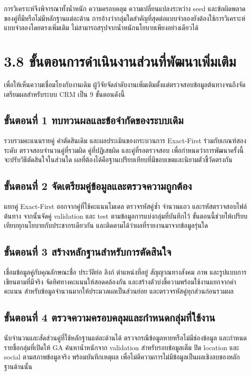 \documentclass[12pt,a4paper]{report}
\begin{document}
การวิเคราะห์จึงพิจารณาทั้งน้ำหนัก ความครอบคลุม ความเปลี่ยนแปลงระหว่าง seed และข้อผิดพลาดของคู่ที่มีหรือไม่มีหลักฐานแต่ละด้าน การอ้างว่ากลุ่มใดสำคัญที่สุดต่อแบบจำลองยังต้องใช้การวิเคราะห์แบบจำลองโดยตรงเพิ่มเติม ไม่สามารถสรุปจากน้ำหนักนโยบายเพียงอย่างเดียวได้

\section*{3.8 ขั้นตอนการดำเนินงานส่วนที่พัฒนาเพิ่มเติม}
เพื่อให้เห็นความเชื่อมโยงกับงานเดิม ผู้วิจัยจัดลำดับงานเพิ่มเติมตั้งแต่ตรวจสอบข้อมูลต้นทางจนถึงจัดเตรียมผลสำหรับระบบ CRM เป็น 9 ขั้นตอนดังนี้

\subsection*{ขั้นตอนที่ 1 ทบทวนผลและข้อจำกัดของระบบเดิม}
รวบรวมคะแนนรายคู่ คำตัดสินเดิม และผลประเมินของกระบวนการ Exact-First ร่วมกับเกณฑ์สองระดับ ตรวจสอบจำนวนคู่ที่รวมผิด คู่ที่ปฏิเสธผิด และคู่ที่รอตรวจสอบ เพื่อกำหนดว่าการพัฒนาครั้งนี้จะปรับวิธีตัดสินใจในส่วนใด ผลที่ต้องได้คือฐานเปรียบเทียบที่มีขอบเขตและนิยามตัวชี้วัดตรงกัน

\subsection*{ขั้นตอนที่ 2 จัดเตรียมคู่ข้อมูลและตรวจความถูกต้อง}
แยกคู่ Exact-First ออกจากคู่ที่ใช้คะแนนโมเดล ตรวจรหัสคู่ซ้ำ จำนวนแถว และรหัสตรวจสอบไฟล์ต้นทาง จากนั้นจัดคู่ validation และ test ตามข้อมูลการแบ่งกลุ่มที่บันทึกไว้ ขั้นตอนนี้ช่วยให้เปรียบเทียบทุกนโยบายกับประชากรเดียวกัน และติดตามได้ว่าผลที่รายงานมาจากข้อมูลรุ่นใด

\subsection*{ขั้นตอนที่ 3 สร้างหลักฐานสำหรับการตัดสินใจ}
เชื่อมข้อมูลคู่กับคุณลักษณะชื่อ ประวัติย่อ ลิงก์ ตำแหน่งที่อยู่ สัญญาณทางสังคม ภาพ และรูปแบบการเขียนตามที่มีจริง จัดทิศทางคะแนนให้สอดคล้องกัน และสร้างตัวบ่งชี้ความพร้อมใช้งานแยกจากค่าคะแนน สำหรับข้อมูลจำนวนมากให้ประมวลผลเป็นส่วนย่อย และตรวจรหัสคู่ทุกส่วนก่อนรวมผล

\subsection*{ขั้นตอนที่ 4 ตรวจความครอบคลุมและกำหนดกลุ่มที่ใช้งาน}
นับจำนวนและสัดส่วนคู่ที่ใช้หลักฐานแต่ละด้านได้ ตรวจกรณีข้อมูลหายหรือไม่มีช่องข้อมูล และกำหนดรายชื่อกลุ่มที่เปิดให้ GA ค้นหาน้ำหนักจาก validation สำหรับรอบข้อมูลเต็ม ปิด location และ social ตามสภาพข้อมูลจริง พร้อมบันทึกเหตุผล เพื่อไม่ตีความการไม่มีข้อมูลเป็นผลเชิงลบของหลักฐานด้านนั้น
\end{document}
